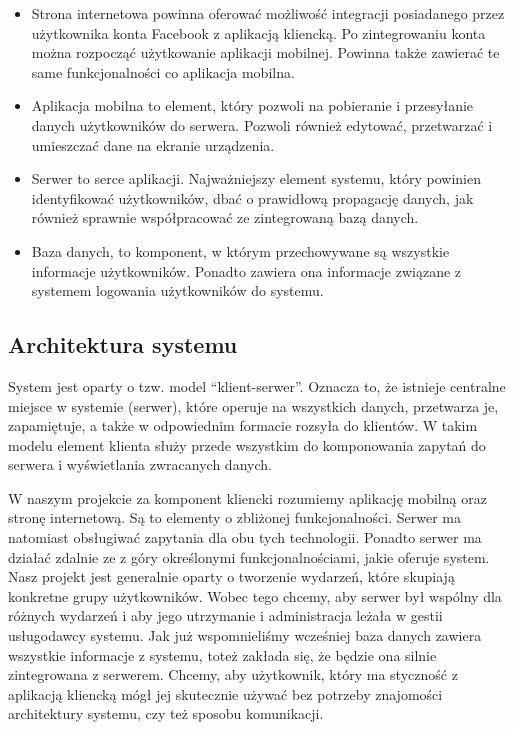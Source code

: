 \documentclass[12pt,titlepage]{article}
\begin{document}
\begin{itemize} %
 \item Strona internetowa powinna oferować możliwość integracji posiadanego przez użytkownika konta Facebook z aplikacją kliencką.
 Po zintegrowaniu konta można rozpocząć użytkowanie aplikacji mobilnej. Powinna także zawierać te same funkcjonalności co aplikacja mobilna.
 \item Aplikacja mobilna to element, który pozwoli na pobieranie i przesyłanie danych użytkowników do serwera. Pozwoli również edytować, przetwarzać i umieszczać
dane na ekranie urządzenia. 
 \item Serwer to serce aplikacji. Najważniejszy element systemu, który powinien identyfikować użytkowników, dbać o prawidłową propagację danych, jak również
 sprawnie współpracować ze zintegrowaną bazą danych.
 \item Baza danych, to komponent, w którym przechowywane są wszystkie informacje użytkowników. Ponadto zawiera ona informacje związane z systemem logowania użytkowników do systemu.
\end{itemize}

\subsection{Architektura systemu}
System jest oparty o tzw. model ``klient-serwer''. Oznacza to, że istnieje centralne miejsce w systemie (serwer), które operuje na wszystkich danych, przetwarza je, zapamiętuje, a także w odpowiednim
formacie rozsyła do klientów. W takim modelu element klienta służy przede wszystkim do komponowania zapytań do serwera i wyświetlania zwracanych danych.

W naszym projekcie za komponent kliencki rozumiemy aplikację mobilną oraz stronę internetową. Są to elementy o zbliżonej funkcjonalności. Serwer ma natomiast obsługiwać zapytania dla obu tych technologii.
Ponadto serwer ma działać zdalnie ze z góry określonymi funkcjonalnościami, jakie oferuje system.
Nasz projekt jest generalnie oparty o tworzenie wydarzeń, które skupiają konkretne grupy użytkowników. Wobec tego chcemy, aby serwer był wspólny dla różnych wydarzeń i aby jego utrzymanie i administracja
leżała w gestii usługodawcy systemu.
Jak już wspomnieliśmy wcześniej baza danych zawiera wszystkie informacje z systemu, toteż zakłada się, że będzie ona silnie zintegrowana z serwerem. Chcemy, aby użytkownik, który ma styczność
z aplikacją kliencką mógł jej skutecznie używać bez potrzeby znajomości architektury systemu, czy też sposobu komunikacji.
\end{document}
